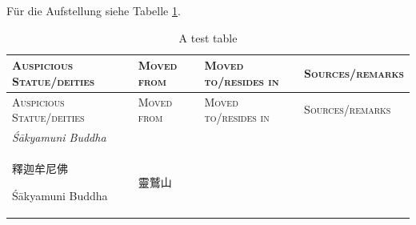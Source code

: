 \documentclass[
  english,
  a4paper,
  DIV=12,
  footlines=2.1,
  usegeometry=true]{scrartcl}
\begin{document}
\leavevmode\marginpar{\textcolor{parnum}{{[}21{]}}}Für die Aufstellung
siehe Tabelle \ref{tbl:tab1}.

\begin{longtable}[]{@{}llll@{}}
\caption{A test table \label{tbl:tab1}}\tabularnewline
\toprule
\begin{minipage}[b]{0.18\columnwidth}\raggedright
\textsc{Auspicious Statue/deities}\strut
\end{minipage} & \begin{minipage}[b]{0.13\columnwidth}\raggedright
\textsc{Moved from}\strut
\end{minipage} & \begin{minipage}[b]{0.13\columnwidth}\raggedright
\textsc{Moved to/resides in}\strut
\end{minipage} & \begin{minipage}[b]{0.44\columnwidth}\raggedright
\textsc{Sources/remarks}\strut
\end{minipage}\tabularnewline
\midrule
\endfirsthead
\toprule
\begin{minipage}[b]{0.18\columnwidth}\raggedright
\textsc{Auspicious Statue/deities}\strut
\end{minipage} & \begin{minipage}[b]{0.13\columnwidth}\raggedright
\textsc{Moved from}\strut
\end{minipage} & \begin{minipage}[b]{0.13\columnwidth}\raggedright
\textsc{Moved to/resides in}\strut
\end{minipage} & \begin{minipage}[b]{0.44\columnwidth}\raggedright
\textsc{Sources/remarks}\strut
\end{minipage}\tabularnewline
\midrule
\endhead
\begin{minipage}[t]{0.18\columnwidth}\raggedright
\emph{Śākyamuni Buddha}\strut
\end{minipage} & \begin{minipage}[t]{0.13\columnwidth}\raggedright
\strut
\end{minipage} & \begin{minipage}[t]{0.13\columnwidth}\raggedright
\strut
\end{minipage} & \begin{minipage}[t]{0.44\columnwidth}\raggedright
\strut
\end{minipage}\tabularnewline
\begin{minipage}[t]{0.18\columnwidth}\raggedright
釋迦牟尼佛

Śākyamuni Buddha\strut
\end{minipage} & \begin{minipage}[t]{0.13\columnwidth}\raggedright
靈鷲山


\end{minipage}
\end{longtable}
\end{document}
